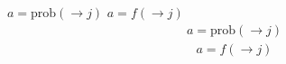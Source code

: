 \documentclass{article}
\begin{document}
$a=\mathrm{prob}(\rightarrow j)$ $a=f(\rightarrow j)$
\[\begin{gathered}a=\mathrm{prob}(\rightarrow j)\end{gathered}\]
\[\begin{gathered}a=f(\rightarrow j)\end{gathered}\]
\end{document}
